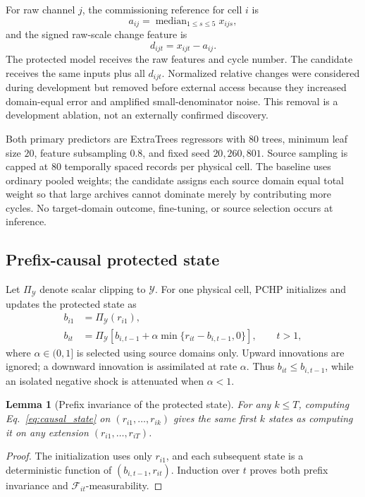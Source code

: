 \documentclass[11pt]{article}
\newtheorem{lemma}{Lemma}
\begin{document}
For raw channel $j$, the commissioning reference for cell $i$ is
\begin{equation}
  a_{ij}=\operatorname{median}_{1\leq s\leq5}x_{ijs},
\end{equation}
and the signed raw-scale change feature is
\begin{equation}
  d_{ijt}=x_{ijt}-a_{ij}.
  \label{eq:change}
\end{equation}
The protected model receives the raw features and cycle number. The candidate receives the same inputs plus all $d_{ijt}$. Normalized relative changes were considered during development but removed before external access because they increased domain-equal error and amplified small-denominator noise. This removal is a development ablation, not an externally confirmed discovery.

Both primary predictors are ExtraTrees regressors with $80$ trees, minimum leaf size $20$, feature subsampling $0.8$, and fixed seed $20{,}260{,}801$. Source sampling is capped at $80$ temporally spaced records per physical cell. The baseline uses ordinary pooled weights; the candidate assigns each source domain equal total weight so that large archives cannot dominate merely by contributing more cycles. No target-domain outcome, fine-tuning, or source selection occurs at inference.

\subsection{Prefix-causal protected state}

Let $\Pi_{\mathcal Y}$ denote scalar clipping to $\mathcal Y$. For one physical cell, PCHP initializes and updates the protected state as
\begin{align}
  b_{i1}&=\Pi_{\mathcal Y}(r_{i1}),\\
  b_{it}&=\Pi_{\mathcal Y}\!\left[b_{i,t-1}
  +\alpha\min\{r_{it}-b_{i,t-1},0\}\right],\qquad t>1,
  \label{eq:causal_state}
\end{align}
where $\alpha\in(0,1]$ is selected using source domains only. Upward innovations are ignored; a downward innovation is assimilated at rate $\alpha$. Thus $b_{it}\leq b_{i,t-1}$, while an isolated negative shock is attenuated when $\alpha<1$.

\begin{lemma}[Prefix invariance of the protected state]
\label{lem:prefix}
For any $k\leq T$, computing Eq.~\eqref{eq:causal_state} on $(r_{i1},\ldots,r_{ik})$ gives the same first $k$ states as computing it on any extension $(r_{i1},\ldots,r_{iT})$.
\end{lemma}
\begin{proof}
The initialization uses only $r_{i1}$, and each subsequent state is a deterministic function of $(b_{i,t-1},r_{it})$. Induction over $t$ proves both prefix invariance and $\mathcal F_{it}$-measurability.
\end{proof}
\end{document}
